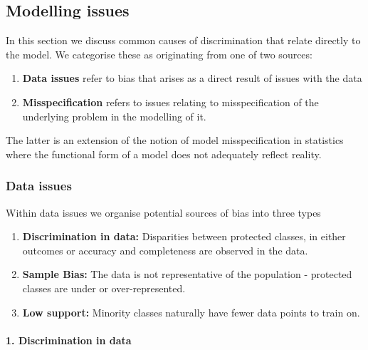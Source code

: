 \subsection{Modelling issues}

In this section we discuss common causes of discrimination that relate directly to the model. We categorise these as originating from one of two sources:
\begin{enumerate}[leftmargin=*]
\item \textbf{Data issues} refer to bias that arises as a direct result of issues with the data
\item \textbf{Misspecification} refers to issues relating to misspecification of the underlying problem in the modelling of it.
\end{enumerate}
The latter is an extension of the notion of model misspecification in statistics where the functional form of a model does not adequately reflect reality.

\subsubsection*{Data issues}

Within data issues we organise potential sources of bias into three types
\begin{enumerate}
\item \textbf{Discrimination in data:} Disparities between protected classes, in either outcomes or accuracy and completeness are observed in the data.
\item \textbf{Sample Bias:} The data is not representative of the population - protected classes are under or over-represented.
\item \textbf{Low support:} Minority classes naturally have fewer data points to train on.
\end{enumerate}

\paragraph*{1. Discrimination in data}

